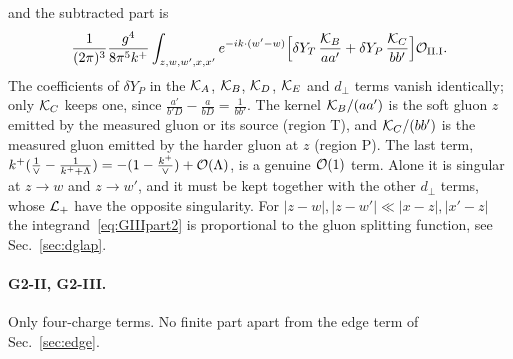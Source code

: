 and the subtracted part is
\begin{equation}
\frac{1}{(2\pi)^3}\frac{g^4}{8\pi^5k^+}\int_{z,w,w',x,x'}e^{-ik\cdot(w'-w)}\Big[\delta Y_T\,\frac{\mathcal{K}_B}{aa'}+\delta Y_P\,\frac{\mathcal{K}_C}{bb'}\Big]\mathcal{O}_{\rm II.I}.
\end{equation}
The coefficients of $\delta Y_P$ in the $\mathcal{K}_A$, $\mathcal{K}_B$, $\mathcal{K}_D$, $\mathcal{K}_E$ and $d_\perp$ terms vanish identically; only $\mathcal{K}_C$ keeps one, since $\frac{a'}{b'D}-\frac{a}{bD}=\frac{1}{bb'}$. The kernel $\mathcal{K}_B/(aa')$ is the soft gluon $z$ emitted by the measured gluon or its source (region T), and $\mathcal{K}_C/(bb')$ is the measured gluon emitted by the harder gluon at $z$ (region P). The last term, $k^+(\frac1\vee-\frac{1}{k^++\Lambda})=-(1-\frac{k^+}{\vee})+\mathcal{O}(\Lambda)$, is a genuine $\mathcal{O}(1)$ term. Alone it is singular at $z\to w$ and $z\to w'$, and it must be kept together with the other $d_\perp$ terms, whose $\mathcal{L}_{+}$ have the opposite singularity. For $|z-w|,|z-w'|\ll|x-z|,|x'-z|$ the integrand~\eqref{eq:GIIIpart2} is proportional to the gluon splitting function, see Sec.~\ref{sec:dglap}.

\paragraph*{G2-II, G2-III.} Only four-charge terms. No finite part apart from the edge term of Sec.~\ref{sec:edge}.

